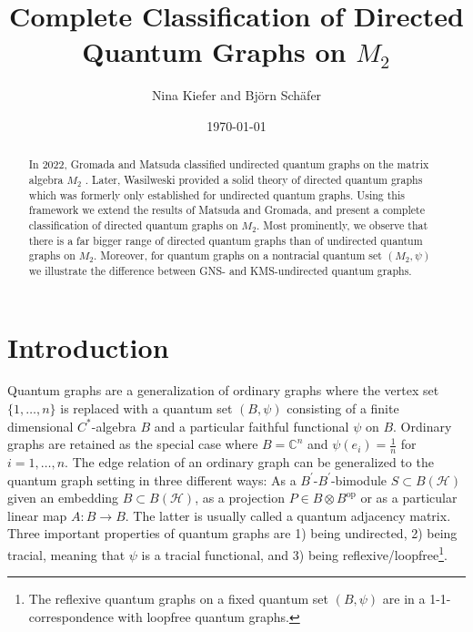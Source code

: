 \documentclass{amsart}
\title{Complete Classification of Directed Quantum Graphs on $M_2$}
\author{Nina Kiefer and Bj\"orn Sch\"afer}
\date{\today}
\newcommand{\C}{\mathbb{C}}
\begin{document}
\begin{abstract}
    In 2022,  Gromada and Matsuda classified undirected quantum graphs on the matrix algebra $M_2$ \cite{gromada_examples_2022, matsuda_classification_2022}. Later, Wasilweski provided a solid theory of directed quantum graphs \cite{wasilewski_quantum_2024} which was formerly only established for undirected quantum graphs. Using this framework we extend the results of Matsuda and Gromada, and present a complete classification of directed quantum graphs on $M_2$. Most prominently, we observe that there is a far bigger range of directed quantum graphs than of undirected quantum graphs on $M_2$. Moreover, for quantum graphs on a nontracial quantum set $(M_2, \psi)$ we illustrate the difference between GNS- and KMS-undirected quantum graphs.
\end{abstract}

\maketitle

\setcounter{tocdepth}{1}    %
\tableofcontents

\section{Introduction}

Quantum graphs are a generalization of ordinary graphs where the vertex set $\{1, \dots, n\}$ is replaced with a quantum set $(B, \psi)$ consisting of a finite dimensional $C^\ast$-algebra $B$ and a particular faithful functional $\psi$ on $B$.
Ordinary graphs are retained as the special case where $B = \C^n$ and $\psi(e_i) = \frac{1}{n}$ for $i=1,\dots, n$.
The edge relation of an ordinary graph can be generalized to the quantum graph setting in three different ways: As a $B^\prime$-$B^\prime$-bimodule $S \subset B(\mathcal{H})$ given an embedding $B \subset B(\mathcal{H})$, as a projection $P \in B \otimes B^\mathrm{op}$ or as a particular linear map $A: B \to B$. The latter is usually called a quantum adjacency matrix. 
Three important properties of quantum graphs are 1) being undirected, 2) being tracial, meaning that $\psi$ is a tracial functional, and 3) being reflexive/loopfree\footnote{The reflexive quantum graphs on a fixed quantum set $(B, \psi)$ are in a 1-1-correspondence with loopfree quantum graphs.}.
\end{document}
